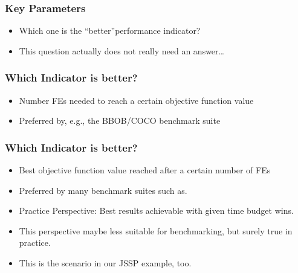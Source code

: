 \documentclass[mathserif]{beamer}%
\begin{document}
%
%
\begin{frame}[t]%
\frametitle{Key Parameters}%
\begin{itemize}%
\item Which one is the ``better''performance indicator?%
%
\item<4-> This question actually does not really need an answer\dots%
%
\end{itemize}%
%
%
%
%
%
\end{frame}%
%
\begin{frame}%
\frametitle{Which Indicator is better?}%
\begin{itemize}%
\item \alert{Number FEs needed to reach a certain objective function value}%
\item Preferred by, e.g., the BBOB/COCO benchmark suite\cite{HAFR2010RPBBOB2ES}%
\end{itemize}%
\end{frame}%
%
\begin{frame}%
\frametitle{Which Indicator is better?}%
\begin{itemize}%
\item \alert{Best objective function value reached after a certain number of FEs}%
\item<2-> Preferred by many benchmark suites such as\cite{TLSYW2010BFFTC2SSACOLSGO}.%
\item<3-> Practice Perspective: Best results achievable with given time budget wins.%
\item<4-> This perspective maybe less suitable for benchmarking, but surely true in practice.%
\item<5-> This is the scenario in our JSSP example, too.%
\end{itemize}%
\end{frame}%
\end{document}
